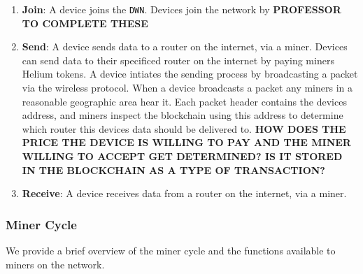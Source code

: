 \documentclass[letterpaper,11pt]{article}
\begin{document}
\begin{enumerate}
  \item \textbf{Join}: A device joins the \verb|DWN|.\newline
  Devices join the network by \textbf{PROFESSOR TO COMPLETE THESE}\newline
  
  \item \textbf{Send}: A device sends data to a router on the internet, via a miner.\newline
  Devices can send data to their specificed router on the internet by paying miners Helium tokens.\newline\newline
  A device intiates the sending process by broadcasting a packet via the wireless protocol. When a device broadcasts a packet any miners in a reasonable geographic area hear it. Each packet header contains the devices address, and miners inspect the blockchain using this address to determine which router this devices data should be delivered to. \textbf{HOW DOES THE PRICE THE DEVICE IS WILLING TO PAY AND THE MINER WILLING TO ACCEPT GET DETERMINED? IS IT STORED IN THE BLOCKCHAIN AS A TYPE OF TRANSACTION?}\newline
  
  \item \textbf{Receive}: A device receives data from a router on the internet, via a miner.\newline
  
  
\end{enumerate}

\subsubsection{Miner Cycle} \label{mining}

We provide a brief overview of the miner cycle and the functions available to miners on the network.
\end{document}

